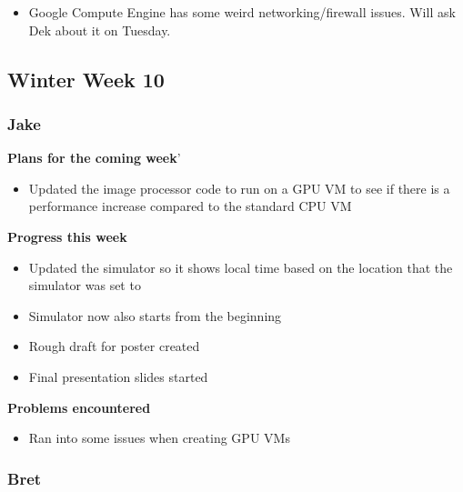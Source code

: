 \documentclass[10pt, onecolumn, draftclsnofoot, letterpaper, compsoc]{IEEEtran}
\begin{document}
    \begin{itemize}

    \item Google Compute Engine has some weird networking/firewall issues. Will ask Dek about it on Tuesday.

    \end{itemize}

\subsection{Winter Week 10}

    \subsubsection{Jake}

    \noindent \textbf{Plans for the coming week}'

    \begin{itemize}

    \item Updated the image processor code to run on a GPU VM to see if there is a performance increase compared to the standard CPU VM

    \end{itemize}

    \noindent \textbf{Progress this week}

    \begin{itemize}

    \item Updated the simulator so it shows local time based on the location that the simulator was set to
    \item Simulator now also starts from the beginning
    \item Rough draft for poster created
    \item Final presentation slides started

    \end{itemize}

    \noindent \textbf{Problems encountered}

    \begin{itemize}

    \item Ran into some issues when creating GPU VMs

    \end{itemize}

    \subsubsection{Bret}
\end{document}
